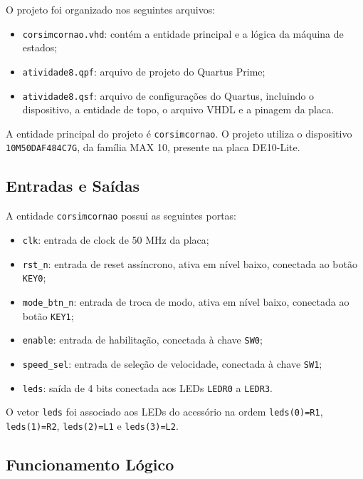 \documentclass[12pt,a4paper, brazil]{article}
\begin{document}
O projeto foi organizado nos seguintes arquivos:

\begin{itemize}
    \item \texttt{corsimcornao.vhd}: contém a entidade principal e a lógica da máquina de estados;
    \item \texttt{atividade8.qpf}: arquivo de projeto do Quartus Prime;
    \item \texttt{atividade8.qsf}: arquivo de configurações do Quartus, incluindo o dispositivo, a entidade de topo, o arquivo VHDL e a pinagem da placa.
\end{itemize}

A entidade principal do projeto é \texttt{corsimcornao}. O projeto utiliza o dispositivo \texttt{10M50DAF484C7G}, da família MAX 10, presente na placa DE10-Lite.

\subsection{Entradas e Saídas}

A entidade \texttt{corsimcornao} possui as seguintes portas:

\begin{itemize}
    \item \texttt{clk}: entrada de clock de 50 MHz da placa;
    \item \texttt{rst\_n}: entrada de reset assíncrono, ativa em nível baixo, conectada ao botão \texttt{KEY0};
    \item \texttt{mode\_btn\_n}: entrada de troca de modo, ativa em nível baixo, conectada ao botão \texttt{KEY1};
    \item \texttt{enable}: entrada de habilitação, conectada à chave \texttt{SW0};
    \item \texttt{speed\_sel}: entrada de seleção de velocidade, conectada à chave \texttt{SW1};
    \item \texttt{leds}: saída de 4 bits conectada aos LEDs \texttt{LEDR0} a \texttt{LEDR3}.
\end{itemize}

O vetor \texttt{leds} foi associado aos LEDs do acessório na ordem \texttt{leds(0)=R1}, \texttt{leds(1)=R2}, \texttt{leds(2)=L1} e \texttt{leds(3)=L2}.

\subsection{Funcionamento Lógico}
\end{document}
